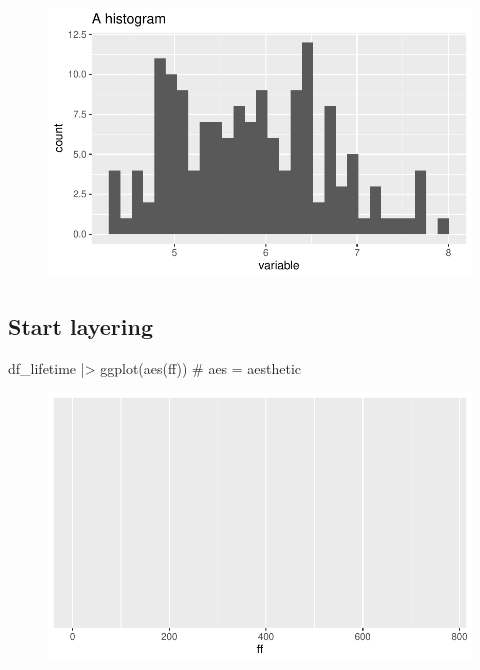 \documentclass[
  letterpaper,
  DIV=11,
  numbers=noendperiod]{scrartcl}
\newenvironment{Shaded}{\begin{snugshade}}{\end{snugshade}}
\newcommand{\CommentTok}[1]{\textcolor[rgb]{0.37,0.37,0.37}{#1}}
\newcommand{\FunctionTok}[1]{\textcolor[rgb]{0.28,0.35,0.67}{#1}}
\newcommand{\NormalTok}[1]{\textcolor[rgb]{0.00,0.23,0.31}{#1}}
\newcommand{\SpecialCharTok}[1]{\textcolor[rgb]{0.37,0.37,0.37}{#1}}
\begin{document}
\begin{figure}[H]

{\centering \includegraphics{_data_viz_files/figure-pdf/unnamed-chunk-10-1.pdf}

}

\end{figure}

\hypertarget{start-layering}{%
\subsection{Start layering}\label{start-layering}}

\begin{Shaded}
\begin{Highlighting}[]
\NormalTok{df\_lifetime }\SpecialCharTok{|\textgreater{}} \FunctionTok{ggplot}\NormalTok{(}\FunctionTok{aes}\NormalTok{(ff)) }\CommentTok{\# aes = \textquotesingle{}aesthetic\textquotesingle{}}
\end{Highlighting}
\end{Shaded}

\begin{figure}[H]

{\centering \includegraphics{_data_viz_files/figure-pdf/unnamed-chunk-11-1.pdf}

}

\end{figure}
\end{document}
